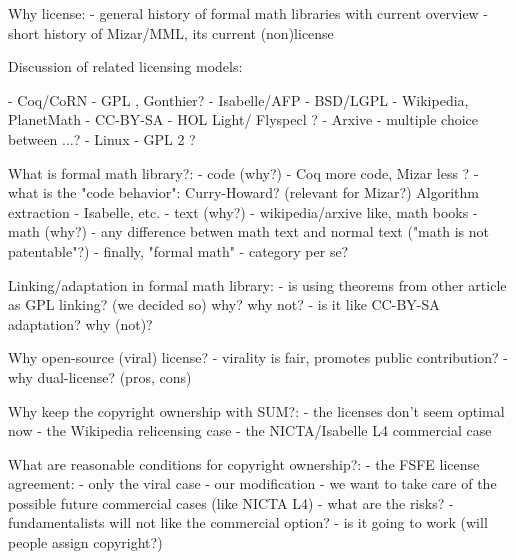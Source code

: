 Why license:
- general history of formal math libraries with current overview
- short history of Mizar/MML, its current (non)license

Discussion of related licensing models:

- Coq/CoRN - GPL , Gonthier?
- Isabelle/AFP - BSD/LGPL
- Wikipedia, PlanetMath - CC-BY-SA
- HOL Light/ Flyspecl ?
- Arxive - multiple choice between ...?
- Linux - GPL 2 ?


What is formal math library?:
- code (why?) - Coq more code, Mizar less ?
- what is the "code behavior": Curry-Howard? (relevant for Mizar?) Algorithm extraction - Isabelle, etc.
- text (why?) - wikipedia/arxive like, math books
- math (why?) - any difference betwen math text and normal text ("math is not patentable"?)
- finally, "formal math" - category per se?

Linking/adaptation in formal math library:
- is using theorems from other article as GPL linking? (we decided so) why? why not?
- is it like CC-BY-SA adaptation? why (not)?

Why open-source (viral) license?
- virality is fair, promotes public contribution?
- why dual-license? (pros, cons)

Why keep the copyright ownership with SUM?:
- the licenses don't seem optimal now
- the Wikipedia relicensing case
- the NICTA/Isabelle L4 commercial case

What are reasonable conditions for copyright ownership?:
- the FSFE license agreement: - only the viral case
- our modification - we want to take care of the possible future commercial cases (like NICTA L4)
- what are the risks? - fundamentalists will not like the commercial option?
- is it going to work (will people assign copyright?)
